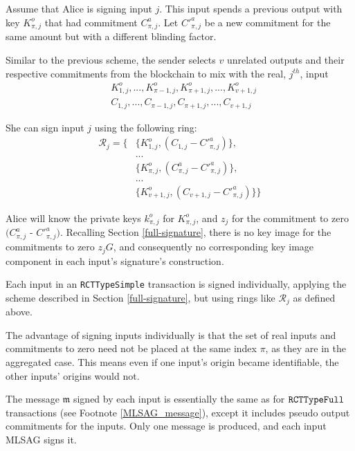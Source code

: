 Assume that Alice is signing input $j$. This input spends a previous output with key $K^o_{\pi,j}$ that had commitment $C^a_{\pi,j}$. Let $C'^a_{\pi,j}$ be a new commitment for the same amount but with a different blinding factor.

Similar to the previous scheme, the sender selects $v$ unrelated outputs and their respective commitments from the blockchain to mix with the real, $j^{th}$, input\vspace{.2cm}
\begin{align*}
& K^o_{1, j}, ..., K^o_{\pi-1, j}, K^o_{\pi+1, j}, ..., K^o_{v+1, j} \\
& C_{1, j}, ..., C_{\pi-1, j}, C_{\pi+1, j}, ..., C_{v+1, j}
\end{align*}


She can sign input $j$ using the following ring:\vspace{.2cm}
\begin{align*}
\mathcal{R}_j = \{ &\{K^o_{1, j}, (C_{1, j} - C'^a_{\pi, j})\}, \\
&... \\
&\{ K^o_{\pi, j}, (C^a_{\pi, j} - C'^a_{\pi, j})\}, \\
&... \\
&\{ K^o_{v+1, j}, (C_{v+1, j} - C'^a_{\pi, j})\}\}
\end{align*}


Alice will know the private keys $k^o_{\pi,j}$ for $K^o_{\pi,j}$, and $z_j$ for the commitment to zero $(C^a_{\pi,j}$ - $C'^a_{\pi,j})$. Recalling Section \ref{full-signature}, there is no key image for the commitments to zero $z_j G$, and consequently no corresponding key image component in each input’s signature’s construction.

Each input in an {\tt RCTTypeSimple} transaction is signed individually, applying the scheme described in Section \ref{full-signature}, but using rings like \(\mathcal{R}_j\) as defined above.

The advantage of signing inputs individually is that the set of real inputs and commitments to zero need not be placed at the same index $\pi$, as they are in the aggregated case. This means even if one input's origin became identifiable, the other inputs' origins would not.

The message $\mathfrak{m}$ signed by each input is essentially the same as for $\tt RCTTypeFull$ transactions (see Footnote \ref{MLSAG_message}), except it includes pseudo output commitments for the inputs. Only one message is produced, and each input MLSAG signs it.


